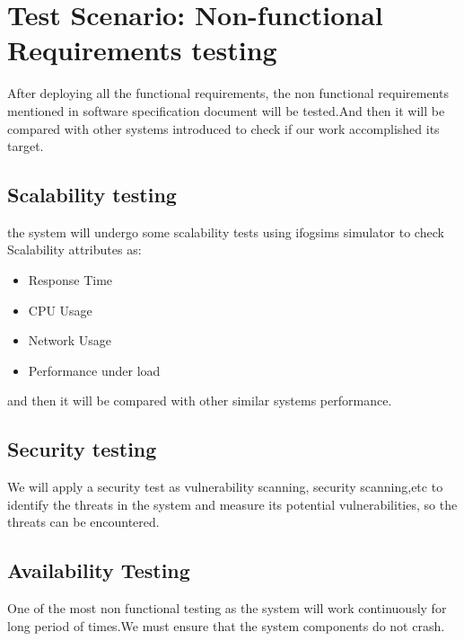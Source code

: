 \documentclass[12pt]{article}
\begin{document}
\section{Test Scenario: Non-functional Requirements testing}
After deploying all the functional requirements, the non functional requirements mentioned in software specification document will be tested.And then it will be compared with other systems introduced to check if our work accomplished its target.
\subsection{Scalability testing}
the system will undergo some scalability tests using ifogsims simulator to check Scalability attributes as:\begin{itemize}
    \item Response Time
    \item CPU Usage
    \item Network Usage
    \item Performance under load
\end{itemize}
and then it will be compared with other similar systems performance.

\subsection{Security testing}
We will apply a security test as vulnerability scanning, security scanning,etc to identify the threats in the system and measure its potential vulnerabilities, so the threats can be encountered.

\subsection{Availability Testing}
One of the most non functional testing as the system will work continuously for long period of times.We must ensure that the system components do not crash.
\end{document}
